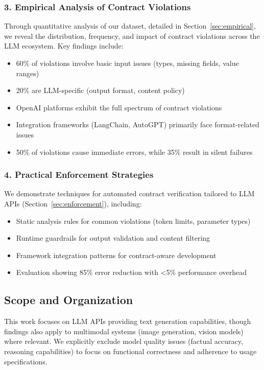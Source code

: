 \documentclass[11pt]{article}
\begin{document}
\subsubsection{3. Empirical Analysis of Contract Violations}
Through quantitative analysis of our dataset, detailed in Section~\ref{sec:empirical}, we reveal the distribution, frequency, and impact of contract violations across the LLM ecosystem. Key findings include:
\begin{itemize}
    \item 60\% of violations involve basic input issues (types, missing fields, value ranges)
    \item 20\% are LLM-specific (output format, content policy)
    \item OpenAI platforms exhibit the full spectrum of contract violations
    \item Integration frameworks (LangChain, AutoGPT) primarily face format-related issues
    \item 50\% of violations cause immediate errors, while 35\% result in silent failures
\end{itemize}

\subsubsection{4. Practical Enforcement Strategies}
We demonstrate techniques for automated contract verification tailored to LLM APIs (Section~\ref{sec:enforcement}), including:
\begin{itemize}
    \item Static analysis rules for common violations (token limits, parameter types)~\cite{pydantic2023}
    \item Runtime guardrails for output validation and content filtering~\cite{guardrails2023}
    \item Framework integration patterns for contract-aware development
    \item Evaluation showing 85\% error reduction with <5\% performance overhead
\end{itemize}

\subsection{Scope and Organization}

This work focuses on LLM APIs providing text generation capabilities, though findings also apply to multimodal systems (image generation, vision models) where relevant. We explicitly exclude model quality issues (factual accuracy, reasoning capabilities) to focus on functional correctness and adherence to usage specifications.
\end{document}
